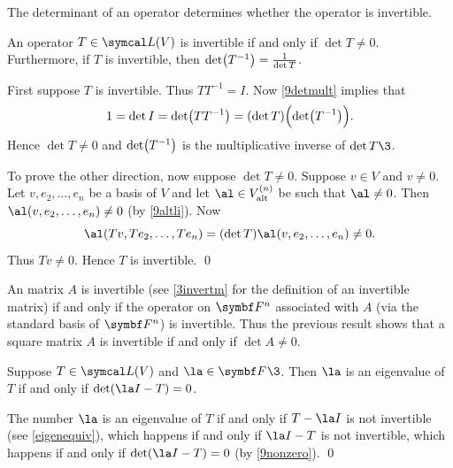 The determinant of an operator determines whether the operator is invertible.

{An operator $T \in \L(V)$ is invertible if and only if $\det T \ne 0$. Furthermore, if $T$ is invertible, then
$
\det \paren[\big]{T^{-1}} = \frac{1}{\det T}$.}

\proof
First suppose $T$ is invertible. Thus $T T^{-1} = I$. Now \ref{9detmult} implies that
\[
1 = \det I = \det \paren[\big]{TT^{-1}} = (\det T) \paren[\Big]{ \det \paren[\big]{T^{-1}}}.
\]
Hence $\det T \ne 0$ and $\det \paren[\big]{T^{-1}}$ is the multiplicative inverse of $\det T\3$.

To prove the other direction, now suppose $\det T \ne 0$. Suppose $v \in V$ and $v \ne 0$. Let $v, e_2, \ldots, e_n$ be a basis of $V$ and let $\al \in V^{(n)}_{\text{alt}}$ be such that $\al \ne 0$. Then $\al(v, e_2, \ldots, e_n) \ne 0$ (by \ref{9altli}). Now
\[
\al(Tv, Te_2, \ldots, Te_n) = (\det T) \al(v, e_2, \ldots, e_n) \ne 0.
\]
Thus $Tv \ne 0$. Hence $T$ is invertible.
\qed

\pagebreak[3]

An  matrix $A$ is invertible (see \ref{3invertm} for the definition of an invertible matrix) if and only if the operator on $\F n$ associated with $A$ \big(via the standard basis of $\F n$\big) is invertible. Thus the previous result shows that a square matrix $A$ is invertible if and only if $\det A \ne 0$.

{Suppose $T \in \L(V)$ and $\la \in \F{}\3$. Then $\la$ is an eigenvalue of $T$ if and only if $\det(\la I - T) = 0$.}

\proof
The number $\la$ is an eigenvalue of $T$ if and only if $T - \la I$ is not invertible (see \ref{eigenequiv}), which happens if and only if
$\la I - T$ is not invertible, which happens if and only if $\det(\la I - T) = 0$ (by \ref{9nonzero}).
\qed

